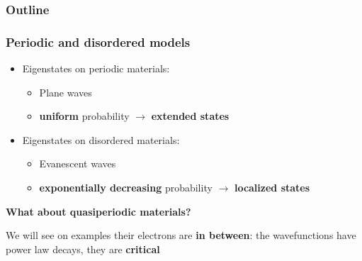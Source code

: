 \documentclass[xcolor=x11names,compress,professionalfonts, aspectratio=169]{beamer}
\renewcommand{\(}{\begin{columns}}
\renewcommand{\)}{\end{columns}}
\newcommand{\<}[1]{\begin{column}{#1}}
\renewcommand{\>}{\end{column}}
\begin{document}

\begin{frame}
\frametitle{Outline}
\tableofcontents[hideallsubsections]
\end{frame}

\begin{frame}
\frametitle{Periodic and disordered models}
\begin{itemize}
	\item Eigenstates on periodic materials: 
	\begin{itemize}
		\item Plane waves 
		\item \textbf{uniform} probability $\rightarrow$ \textbf{extended states}
	\end{itemize}
	
	\item Eigenstates on disordered materials: 
	\begin{itemize}
		\item Evanescent waves
		\item  \textbf{exponentially decreasing} probability $\rightarrow$ \textbf{localized states}
	\end{itemize}
	
\end{itemize}
\textbf{What about quasiperiodic materials?}

\textcolor{Complementary}{We will see on examples their electrons are \textbf{in between}: the wavefunctions have power law decays, they are \textbf{critical}}
\end{frame}
\end{document}

